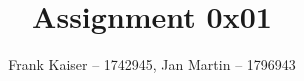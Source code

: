 \documentclass{article}
\begin{document}
\title{Assignment 0x01}
\author{Frank Kaiser -- 1742945, Jan Martin -- 1796943}

\maketitle







\end{document}
